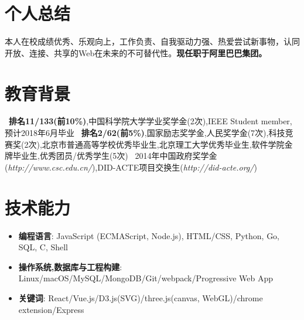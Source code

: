 \documentclass{resume}
\begin{document}


 
\section{个人总结}
本人在校成绩优秀、乐观向上，工作负责、自我驱动力强、热爱尝试新事物，认同开放、连接、共享的Web在未来的不可替代性。\textbf{现任职于阿里巴巴集团。}

\section{教育背景}
\ \textbf{排名11/133(前10\%)},中国科学院大学学业奖学金(2次),IEEE Student member,预计2018年6月毕业
\ \textbf{排名2/62(前5\%)},国家励志奖学金,人民奖学金(7次),科技竞赛奖(2次),北京市普通高等学校优秀毕业生,北京理工大学优秀毕业生,软件学院金牌毕业生,优秀团员/优秀学生(5次)
\ 2014年中国政府奖学金(\textit{http://www.csc.edu.cn/}),DID-ACTE项目交换生(\textit{http://did-acte.org/})

\section{技术能力}
\begin{itemize}[parsep=0.2ex]
  \item \textbf{编程语言}: JavaScript (ECMAScript, Node.js), HTML/CSS, Python, Go, SQL, C, Shell
  \item \textbf{操作系统,数据库与工程构建}: Linux/macOS/MySQL/MongoDB/Git/webpack/Progressive Web App
  \item \textbf{关键词}: React/Vue.js/D3.js(SVG)/three.js(canvas, WebGL)/chrome extension/Express
\end{itemize}
\end{document}
